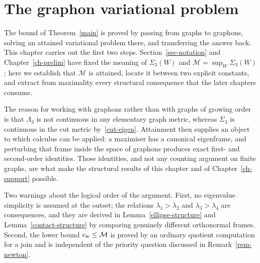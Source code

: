 \chapter{The graphon variational problem}\label{ch-variational}\label{sec-variational}

The bound of Theorem~\ref{main} is proved by passing from graphs to graphons,
solving an attained variational problem there, and transferring the answer
back. This chapter carries out the first two steps. Section~\ref{sec-notation}
and Chapter~\ref{ch-prelim} have fixed the meaning of $\Sigma_3(W)$ and
$\mathcal M=\sup_W\Sigma_3(W)$; here we establish that $\mathcal M$ is
attained, locate it between two explicit constants, and extract from
maximality every structural consequence that the later chapters consume.

The reason for working with graphons rather than with graphs of growing order
is that $\Lambda_3$ is not continuous in any elementary graph metric, whereas
$\Sigma_3$ is continuous in the cut metric by~\eqref{cut-eigen}. Attainment
then supplies an object to which calculus can be applied: a maximiser has a
canonical eigenframe, and perturbing that frame inside the space of graphons
produces exact first- and second-order identities. Those identities, and not
any counting argument on finite graphs, are what make the structural results
of this chapter and of Chapter~\ref{ch-support} possible.

Two warnings about the logical order of the argument. First, no eigenvalue
simplicity is assumed at the outset; the relations $\lambda_1>\lambda_2$ and
$\lambda_3>\lambda_4$ are consequences, and they are derived in
Lemma~\ref{ellipse-structure} and Lemma~\ref{contact-structure} by comparing
genuinely different orthonormal frames. Second, the lower bound
$c_{\mathrm{w}}\le\mathcal M$ is proved by an ordinary quotient computation for a
join and is independent of the priority question discussed in
Remark~\ref{rem-newton}.


